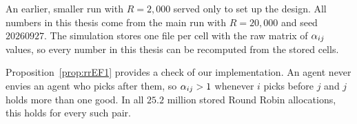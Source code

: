 An earlier, smaller run with $R=2{,}000$ served only to set up the design. All numbers in this
thesis come from the main run with $R=20{,}000$ and seed $20260927$. The simulation stores one
file per cell with the raw matrix of $\alpha_{ij}$ values, so every number in this thesis can be
recomputed from the stored cells.

Proposition~\ref{prop:rrEF1} provides a check of our implementation. An agent never envies an
agent who picks after them, so $\alpha_{ij}>1$ whenever $i$ picks before $j$ and $j$ holds more than one
good. In all $25.2$ million stored Round Robin allocations, this holds for every such pair.
